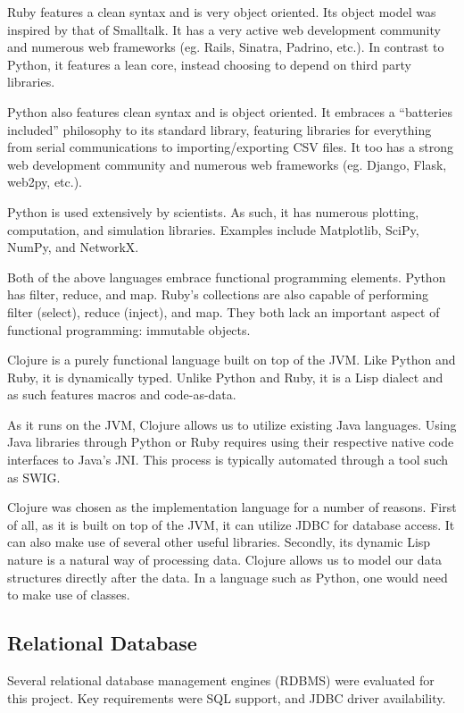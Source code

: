 \documentclass[12pt,letterpaper,oneside,notitlepage]{report}
\theoremstyle{definition}
\begin{document}
        Ruby features a clean syntax and is very object oriented.  Its object model was inspired by that of Smalltalk.  It has a very active web development community and numerous web frameworks (eg. Rails, Sinatra, Padrino, etc.).  In contrast to Python, it features a lean core, instead choosing to depend on third party libraries.
        
        Python also features clean syntax and is object oriented.  It embraces a ``batteries included'' philosophy to its standard library, featuring libraries for everything from serial communications to importing/exporting CSV files.  It too has a strong web development community and numerous web frameworks (eg. Django, Flask, web2py, etc.).
        
        Python is used extensively by scientists.  As such, it has numerous plotting, computation, and simulation libraries.  Examples include Matplotlib, SciPy, NumPy, and NetworkX.
        
        Both of the above languages embrace functional programming elements.  Python has filter, reduce, and map.  Ruby's collections are also capable of performing filter (select), reduce (inject), and map.  They both lack an important aspect of functional programming:  immutable objects.
        
        Clojure is a purely functional language built on top of the JVM.  Like Python and Ruby, it is dynamically typed.  Unlike Python and Ruby, it is a Lisp dialect and as such features macros and code-as-data.
        
        As it runs on the JVM, Clojure allows us to utilize existing Java languages.  Using Java libraries through Python or Ruby requires using their respective native code interfaces to Java's JNI.  This process is typically automated through a tool such as SWIG.
        
        Clojure was chosen as the implementation language for a number of reasons.  First of all, as it is built on top of the JVM, it can utilize JDBC for database access.  It can also make use of several other useful libraries.  Secondly, its dynamic Lisp nature is a natural way of processing data.  Clojure allows us to model our data structures directly after the data.  In a language such as Python, one would need to make use of classes.
      
      \subsection{Relational Database}
        Several relational database management engines (RDBMS) were evaluated for this project.  Key requirements were SQL support, and JDBC driver availability.
        
\end{document}
